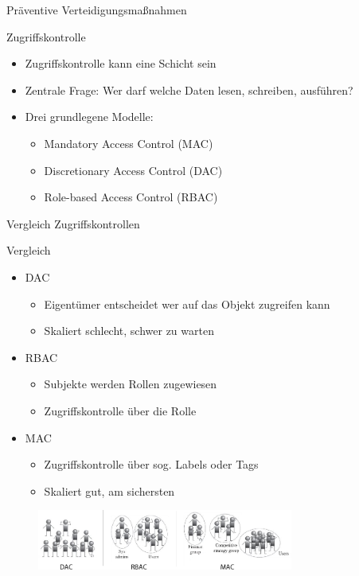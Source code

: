 \begin{frame}{Präventive Verteidigungsmaßnahmen}
  \begin{block}{Zugriffskontrolle}
    \begin{itemize}[<+->]
      \item Zugriffskontrolle kann eine Schicht sein
      \item Zentrale Frage: Wer darf welche Daten lesen, schreiben, ausführen?
      \item Drei grundlegene Modelle:
      \begin{itemize}[<+->]
        \item Mandatory Access Control (MAC)
        \item Discretionary Access Control (DAC)
        \item Role-based Access Control (RBAC)
      \end{itemize}
    \end{itemize}
  \end{block}
\end{frame}

\begin{frame}{Vergleich Zugriffskontrollen}
  \begin{block}{Vergleich}
    \begin{itemize}[<+->]
      \item DAC
      \begin{itemize}[<+->]
        \item Eigentümer entscheidet wer auf das Objekt zugreifen kann
        \item Skaliert schlecht, schwer zu warten
      \end{itemize}
      \item RBAC
      \begin{itemize}[<+->]
        \item Subjekte werden Rollen zugewiesen
        \item Zugriffskontrolle über die Rolle
      \end{itemize}
      \item MAC
      \begin{itemize}[<+->]
        \item Zugriffskontrolle über sog. Labels oder Tags
        \item Skaliert gut, am sichersten
      \end{itemize}
    \end{itemize}
  \end{block}
  \begin{figure}
    \centering
    \includegraphics[width=0.75\textwidth]{assets/access_control2}
  \end{figure}
\end{frame}

